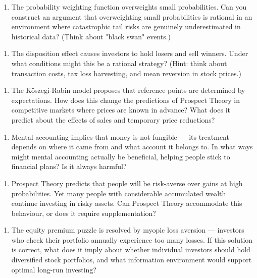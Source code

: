 \documentclass[12pt, letterpaper]{article}
\begin{document}
\begin{enumerate}
\item The probability weighting function overweights small probabilities. Can you construct an argument that overweighting small probabilities is rational in an environment where catastrophic tail risks are genuinely underestimated in historical data? (Think about "black swan" events.)
\end{enumerate}

\begin{enumerate}
\item The disposition effect causes investors to hold losers and sell winners. Under what conditions might this be a rational strategy? (Hint: think about transaction costs, tax loss harvesting, and mean reversion in stock prices.)
\end{enumerate}

\begin{enumerate}
\item The Köszegi-Rabin model proposes that reference points are determined by expectations. How does this change the predictions of Prospect Theory in competitive markets where prices are known in advance? What does it predict about the effects of sales and temporary price reductions?
\end{enumerate}

\begin{enumerate}
\item Mental accounting implies that money is not fungible --- its treatment depends on where it came from and what account it belongs to. In what ways might mental accounting actually be beneficial, helping people stick to financial plans? Is it always harmful?
\end{enumerate}

\begin{enumerate}
\item Prospect Theory predicts that people will be risk-averse over gains at high probabilities. Yet many people with considerable accumulated wealth continue investing in risky assets. Can Prospect Theory accommodate this behaviour, or does it require supplementation?
\end{enumerate}

\begin{enumerate}
\item The equity premium puzzle is resolved by myopic loss aversion --- investors who check their portfolio annually experience too many losses. If this solution is correct, what does it imply about whether individual investors should hold diversified stock portfolios, and what information environment would support optimal long-run investing?
\end{enumerate}
\end{document}
